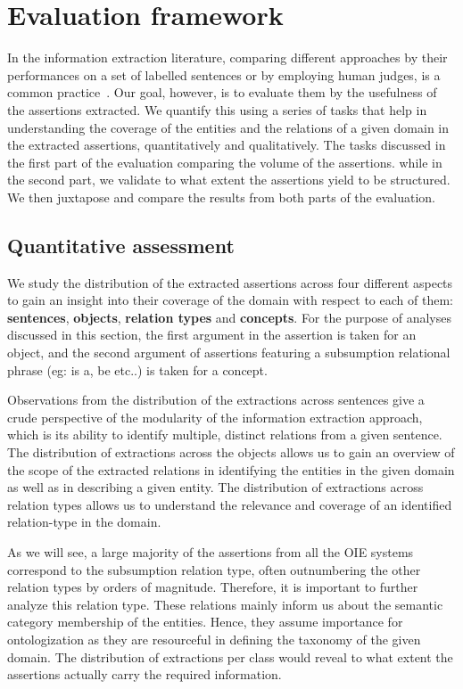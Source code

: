 \documentclass{llncs}
\begin{document}
\section{Evaluation framework}
\label{sec:framework}
In the information extraction literature, comparing different approaches by their performances on a set of labelled sentences or by employing human judges, is a common practice~\cite{Fader2011a,Mausam2012a}. Our goal, however, is to evaluate them by the usefulness of the assertions extracted. We quantify this using a series of tasks that help in understanding the coverage of the entities and the relations of a given domain in the extracted assertions, quantitatively and qualitatively.  The tasks discussed in the first part of the evaluation comparing the volume of the assertions. while in the second part, we validate to what extent the assertions yield to be structured. We then juxtapose and compare the results from both parts of the evaluation.

\subsection{Quantitative assessment}
We study the distribution of the extracted assertions across four different aspects to gain an insight into their coverage of the domain with respect to each of them: \textbf{sentences}, \textbf{objects}, \textbf{relation types} and \textbf{concepts}. For the purpose of analyses discussed in this section, the first argument in the assertion is taken for an object, and the second argument of assertions featuring a subsumption relational phrase (eg: is a, be etc..) is taken for a concept.

Observations from the distribution of the extractions across sentences give a crude perspective of the modularity of the information extraction approach, which is its ability to identify multiple, distinct relations from a given sentence. The distribution of extractions across the objects allows us to gain an overview of the scope of the extracted relations in identifying the entities in the given domain as well as in describing a given entity. The distribution of extractions across relation types allows us to understand the relevance and coverage of an identified relation-type in the domain. 

As we will see, a large majority of the assertions from all the OIE systems correspond to the subsumption relation type, often outnumbering the other relation types by orders of magnitude. Therefore, it is important to further analyze this relation type. These relations mainly inform us about the semantic category membership of the entities. Hence, they assume importance for ontologization as they are resourceful in defining the taxonomy of the given domain. The distribution of extractions per class would reveal to what extent the assertions actually carry the required information.
\end{document}
